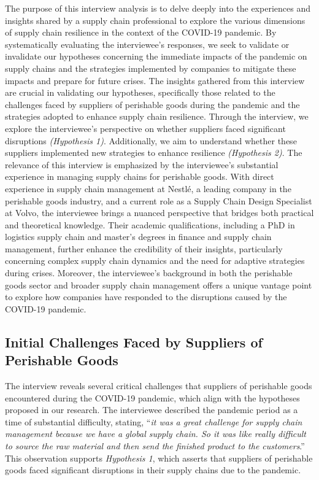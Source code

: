 The purpose of this interview analysis is to delve deeply into the experiences and insights shared by a supply chain professional to explore the various dimensions of supply chain resilience in the context of the COVID-19 pandemic. By systematically evaluating the interviewee's responses, we seek to validate or invalidate our hypotheses concerning the immediate impacts of the pandemic on supply chains and the strategies implemented by companies to mitigate these impacts and prepare for future crises. The insights gathered from this interview are crucial in validating our hypotheses, specifically those related to the challenges faced by suppliers of perishable goods during the pandemic and the strategies adopted to enhance supply chain resilience. Through the interview, we explore the interviewee's perspective on whether suppliers faced significant disruptions \textit{(Hypothesis 1)}. Additionally, we aim to understand whether these suppliers implemented new strategies to enhance resilience \textit{(Hypothesis 2)}. 
The relevance of this interview is emphasized by the interviewee's substantial experience in managing supply chains for perishable goods. With direct experience in supply chain management at Nestlé, a leading company in the perishable goods industry, and a current role as a Supply Chain Design Specialist at Volvo, the interviewee brings a nuanced perspective that bridges both practical and theoretical knowledge. Their academic qualifications, including a PhD in logistics supply chain and master’s degrees in finance and supply chain management, further enhance the credibility of their insights, particularly concerning complex supply chain dynamics and the need for adaptive strategies during crises. Moreover, the interviewee's background in both the perishable goods sector and broader supply chain management offers a unique vantage point to explore how companies have responded to the disruptions caused by the COVID-19 pandemic.

\subsection{Initial Challenges Faced by Suppliers of Perishable Goods}

The interview reveals several critical challenges that suppliers of perishable goods encountered during the COVID-19 pandemic, which align with the hypotheses proposed in our research. The interviewee described the pandemic period as a time of substantial difficulty, stating, “\textit{it was a great challenge for supply chain management because we have a global supply chain. So it was like really difficult to source the raw material and then send the finished product to the customers}.” This observation supports \textit{Hypothesis 1}, which asserts that suppliers of perishable goods faced significant disruptions in their supply chains due to the pandemic.

